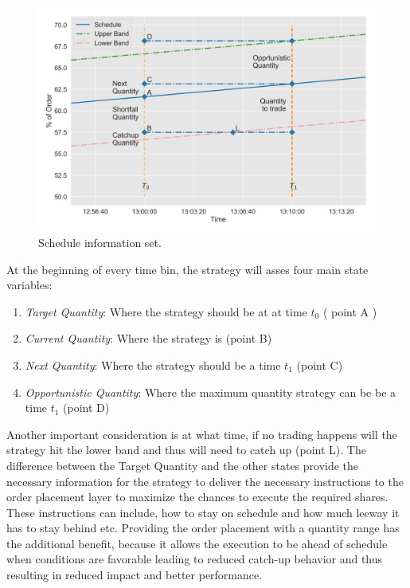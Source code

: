	\begin{figure}[!ht]
	\centering
	\includegraphics[width=\textwidth]{chapters/chapter_exec_models/figures/schedule_details.png} 
	\caption{Schedule information set. \label{fig:sch_details}}
	\end{figure}

At the beginning of every time bin, the strategy will asses four main state variables:

\begin{enumerate}
\item\emph{Target Quantity}: Where the strategy should be at at time $t_0$ ( point A )
\item\emph{Current Quantity}: Where the strategy is (point B)
\item\emph{Next Quantity}: Where the strategy should be a time $t_1$ (point C)
\item\emph{Opportunistic Quantity}: Where the maximum quantity strategy can be be a time $t_1$ (point D)
\end{enumerate}


Another important consideration is at what time, if no trading happens will the strategy hit the lower band and thus will need to catch up (point L). The difference between the Target Quantity and the other states provide the necessary  information for the strategy to deliver the necessary instructions to the order placement layer to maximize the chances to execute the required shares. These instructions can include, how to stay on schedule and how much leeway it has to stay behind etc. Providing the order placement with a quantity range has the additional benefit, because it allows the execution to be ahead of schedule when conditions are favorable leading to reduced catch-up behavior and thus resulting in reduced impact and better performance.


